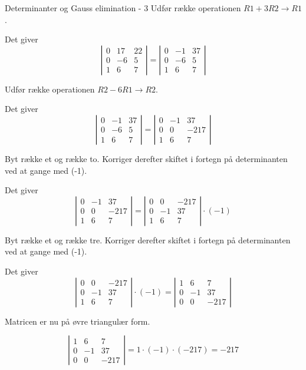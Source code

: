 \documentclass{article}
\begin{document}
\begin{exercise}{Determinanter og Gauss elimination - 3}
\hint
Udfør række operationen
$R1 + 3R2 \to R1$.

\hint
Det giver 
\[
\left|\begin{array}{rrr}
0 & 17 & 22 \\ 
0 & -6 & 5 \\
1 & 6 & 7
\end{array} \right|
=
\left|\begin{array}{rrr}
0 & -1 & 37 \\ 
0 & -6 & 5 \\
1 & 6 & 7
\end{array} \right|
\]

\hint
Udfør række operationen
$R2 - 6R1 \to R2$.

\hint
Det giver 
\[
\left|\begin{array}{rrr}
0 & -1 & 37 \\ 
0 & -6 & 5 \\
1 & 6 & 7
\end{array} \right|
=
\left|\begin{array}{rrr}
0 & -1 & 37 \\ 
0 & 0 & -217 \\
1 & 6 & 7
\end{array} \right|
\]

\hint
Byt række et og række to.
Korriger derefter skiftet i fortegn på determinanten ved at
gange med (-1).

\hint
Det giver 
\[
\left|\begin{array}{rrr}
0 & -1 & 37 \\ 
0 & 0 & -217 \\
1 & 6 & 7
\end{array} \right|
=
\left|\begin{array}{rrr}
0 & 0 & -217 \\
0 & -1 & 37 \\ 
1 & 6 & 7
\end{array} \right| \cdot (-1)
\]

\hint
Byt række et og række tre.
Korriger derefter skiftet i fortegn på determinanten ved at
gange med (-1).

\hint
Det giver 
\[
\left|\begin{array}{rrr}
0 & 0 & -217 \\
0 & -1 & 37 \\ 
1 & 6 & 7
\end{array} \right| \cdot (-1)
=
\left|\begin{array}{rrr}
1 & 6 & 7 \\
0 & -1 & 37 \\ 
0 & 0 & -217
\end{array} \right|
\]

\hint
Matricen er nu på øvre triangulær form.

\hint
\[
\left|\begin{array}{rrr}
1 & 6 & 7 \\
0 & -1 & 37 \\ 
0 & 0 & -217
\end{array} \right|
= 1 \cdot (-1) \cdot (-217) = -217
\]


\end{exercise}
\end{document}
